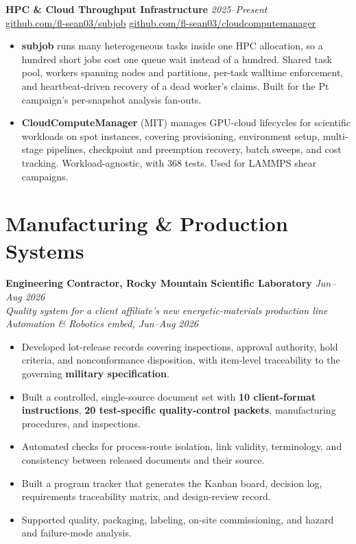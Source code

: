 \documentclass[letterpaper,10pt]{article}
\newcommand{\keep}{\needspace{4\baselineskip}}
\newcommand{\keepsection}{\needspace{6\baselineskip}}
\begin{document}
\keep\textbf{HPC \& Cloud Throughput Infrastructure} \hfill \textit{2025--Present}\\
\href{https://github.com/fl-sean03/subjob}{github.com/fl-sean03/subjob} \;\textbar\; \href{https://github.com/fl-sean03/cloudcomputemanager}{github.com/fl-sean03/cloudcomputemanager}
\begin{itemize}
    \item \textbf{subjob} runs many heterogeneous tasks inside one HPC allocation, so a hundred short jobs cost one queue wait instead of a hundred. Shared task pool, workers spanning nodes and partitions, per-task walltime enforcement, and heartbeat-driven recovery of a dead worker's claims. Built for the Pt campaign's per-snapshot analysis fan-outs.
    \item \textbf{CloudComputeManager} (MIT) manages GPU-cloud lifecycles for scientific workloads on spot instances, covering provisioning, environment setup, multi-stage pipelines, checkpoint and preemption recovery, batch sweeps, and cost tracking. Workload-agnostic, with 368 tests. Used for LAMMPS shear campaigns.
\end{itemize}

\keepsection\section*{Manufacturing \& Production Systems}
\textbf{Engineering Contractor, Rocky Mountain Scientific Laboratory} \hfill \textit{Jun--Aug 2026}\\
\textit{Quality system for a client affiliate's new energetic-materials production line}\\
\textit{Automation \& Robotics embed, Jun--Aug 2026}
\begin{itemize}
    \item Developed lot-release records covering inspections, approval authority, hold criteria, and nonconformance disposition, with item-level traceability to the governing \textbf{military specification}.
    \item Built a controlled, single-source document set with \textbf{10 client-format instructions}, \textbf{20 test-specific quality-control packets}, manufacturing procedures, and inspections.
    \item Automated checks for process-route isolation, link validity, terminology, and consistency between released documents and their source.
    \item Built a program tracker that generates the Kanban board, decision log, requirements traceability matrix, and design-review record.
    \item Supported quality, packaging, labeling, on-site commissioning, and hazard and failure-mode analysis.
\end{itemize}
\end{document}
